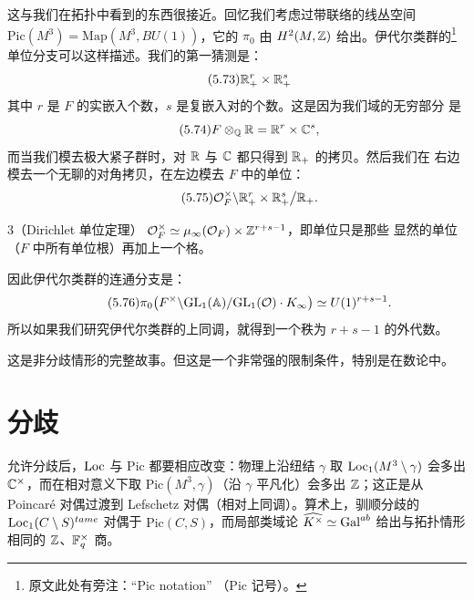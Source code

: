 这与我们在拓扑中看到的东西很接近。回忆我们考虑过带联络的线丛空间
$\mathrm{Pic}(M^{3})=\mathrm{Map}(M^{3},BU(1))$，它的 $\pi_{0}$ 由
$H^{2}(M,\mathbb{Z})$ 给出。伊代尔类群的\footnote{原文此处有旁注：“Pic notation”
（$\mathrm{Pic}$ 记号）。}单位分支可以这样描述。我们的第一猜测是：
\begin{equation}\tag{5.73}
\mathbb{R}^{r}_{+}\times\mathbb{R}^{s}_{+}
\end{equation}
其中 $r$ 是 $F$ 的实嵌入个数，$s$ 是复嵌入对的个数。这是因为我们域的无穷部分
是
\begin{equation}\tag{5.74}
F\otimes_{\mathbb{Q}}\mathbb{R}=\mathbb{R}^{r}\times\mathbb{C}^{s},
\end{equation}
而当我们模去极大紧子群时，对 $\mathbb{R}$ 与 $\mathbb{C}$ 都只得到 $\mathbb{R}_{+}$ 的拷贝。然后我们在
右边模去一个无聊的对角拷贝，在左边模去 $F$ 中的单位：
\begin{equation}\tag{5.75}
\mathcal{O}_{F}^{\times}\backslash\mathbb{R}^{r}_{+}\times\mathbb{R}^{s}_{+}\big/\mathbb{R}_{+}.
\end{equation}

\begin{srcthm}{3}（Dirichlet 单位定理）
$\mathcal{O}_{F}^{\times}\simeq\mu_{\infty}(\mathcal{O}_{F})\times\mathbb{Z}^{r+s-1}$，即单位只是那些
显然的单位（$F$ 中所有单位根）再加上一个格。
\end{srcthm}

因此伊代尔类群的连通分支是：
\begin{equation}\tag{5.76}
\pi_{0}\bigl(F^{\times}\backslash\mathrm{GL}_{1}(\mathbb{A})/\mathrm{GL}_{1}(\mathcal{O})\cdot K_{\infty}\bigr)
\simeq U(1)^{r+s-1}.
\end{equation}
所以如果我们研究伊代尔类群的上同调，就得到一个秩为 $r+s-1$ 的外代数。


这是非分歧情形的完整故事。但这是一个非常强的限制条件，特别是在数论中。

\section{分歧}
\begin{sectionkey}
允许分歧后，$\mathrm{Loc}$ 与 $\mathrm{Pic}$ 都要相应改变：物理上沿纽结 $\gamma$ 取
$\mathrm{Loc}_{1}(M^{3}\setminus\gamma)$ 会多出 $\mathbb{C}^{\times}$，而在相对意义下取
$\mathrm{Pic}(M^{3},\gamma)$（沿 $\gamma$ 平凡化）会多出 $\mathbb{Z}$；这正是从
Poincaré 对偶过渡到 Lefschetz 对偶（相对上同调）。算术上，驯顺分歧的
$\mathrm{Loc}_{1}(C\setminus S)^{tame}$ 对偶于 $\mathrm{Pic}(C,S)$，而局部类域论
$\widehat{K^{\times}}\simeq\mathrm{Gal}^{ab}$ 给出与拓扑情形相同的 $\mathbb{Z}$、$\mathbb{F}_{q}^{\times}$
商。
\end{sectionkey}

